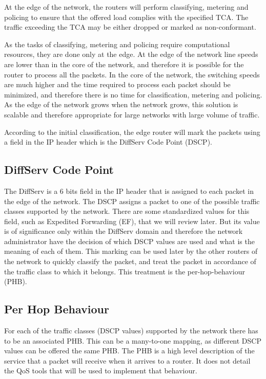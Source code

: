 At the edge of the network, the routers will perform classifying, metering and policing to ensure that the offered load complies with the specified TCA.
The traffic exceeding the TCA may be either dropped or marked as non-conformant.

As the tasks of classifying, metering and policing require computational resources, they are done only at the edge.
At the edge of the network line speeds are lower than in the core of the network, and therefore it is possible for the router to process all the packets.
In the core of the network, the switching speeds are much higher and the time required to process each packet should be minimized, and therefore there is no time for classification, metering and policing.
As the edge of the network grows when the network grows, this solution is scalable and therefore appropriate for large networks with large volume of traffic.

According to the initial classification, the edge router will mark the packets using a field in the IP header which is the DiffServ Code Point (DSCP).

\subsection{DiffServ Code Point}

The DiffServ is a 6 bits field in the IP header that is assigned to each packet in the edge of the network.
The DSCP assigns a packet to one of the possible traffic classes supported by the network.
There are some standardized values for this field, such as Expedited Forwarding (EF), that we will review later.
But its value is of significance only within the DiffServ domain and therefore the network administrator have the decision of which DSCP values are used and what is the meaning of each of them.
This marking can be used later by the other routers of the network to quickly classify the packet, and treat the packet in accordance of the traffic class to which it belongs.
This treatment is the per-hop-behaviour (PHB).

\subsection{Per Hop Behaviour}

For each of the traffic classes (DSCP values) supported by the network there has to be an associated PHB.
This can be a many-to-one mapping, as different DSCP values can be offered the same PHB.
The PHB is a high level description of the service that a packet will receive when it arrives to a router.
It does not detail the QoS tools that will be used to implement that behaviour.

